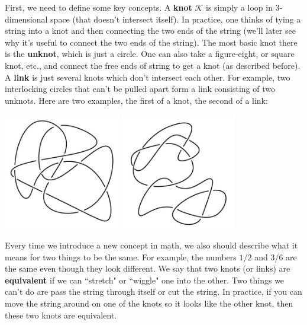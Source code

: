 \documentclass[12 pt]{article}
\begin{document}
First, we need to define some key concepts. A \textbf{knot} $\mathcal{K}$ is simply a loop in 3-dimensional space (that doesn't intersect itself). In practice, one thinks of tying a string into a knot and then connecting the two ends of the string (we'll later see why it's useful to connect the two ends of the string). The most basic knot there is the \textbf{unknot}, which is just a circle. One can also take a figure-eight, or square knot, etc., and connect the free ends of string to get a knot (as described before). A \textbf{link} is just several knots which don't intersect each other. For example, two interlocking circles that can't be pulled apart form a link consisting of two unknots. Here are two examples, the first of a knot, the second of a link:
\begin{center}
\includegraphics[height = 2in]{knot_ex_1.jpg} \quad \includegraphics[height = 2in]{knot_ex_2.jpg}
\end{center}

Every time we introduce a new concept in math, we also should describe what it means for two things to be the same. For example, the numbers $1/2$ and $3/6$ are the same even though they look different. We say that two knots (or links) are \textbf{equivalent} if we can ``stretch" or ``wiggle" one into the other. Two things we can't do are pass the string through itself or cut the string. In practice, if you can move the string around on one of the knots so it looks like the other knot, then these two knots are equivalent.
\end{document}
